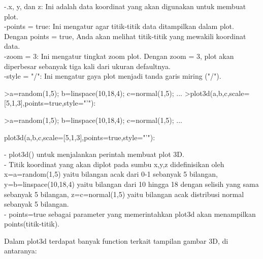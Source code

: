 \documentclass[a4paper,10pt]{article}
\begin{document}
\begin{eulernotebook}
\begin{eulercomment}
\begin{eulercomment}
\begin{eulercomment}
\begin{eulercomment}
\begin{eulercomment}
\begin{eulercomment}
\begin{eulercomment}
\begin{eulercomment}
\begin{eulercomment}
-.x, y, dan z: Ini adalah data koordinat yang akan digunakan untuk
membuat plot.\\
-points = true: Ini mengatur agar titik-titik data ditampilkan dalam
plot. Dengan points = true, Anda akan melihat titik-titik yang
mewakili koordinat data.\\
-zoom = 3: Ini mengatur tingkat zoom plot. Dengan zoom = 3, plot akan
diperbesar sebanyak tiga kali dari ukuran defaultnya.\\
-style = "/": Ini mengatur gaya plot menjadi tanda garis miring ("/").
\end{eulercomment}
\begin{eulerprompt}
>a=random(1,5); b=linspace(10,18,4); c=normal(1,5); ...
>plot3d(a,b,c,scale=[5,1,3],points=true,style="'"):
\end{eulerprompt}
\begin{eulercomment}
\textgreater{}a=random(1,5); b=linspace(10,18,4); c=normal(1,5); ...\\
\end{eulercomment}
\begin{eulerttcomment}
 plot3d(a,b,c,scale=[5,1,3],points=true,style="'"):
\end{eulerttcomment}
\begin{eulercomment}

- plot3d() untuk menjalankan perintah membuat plot 3D.\\
- Titik koordinat yang akan diplot pada sumbu x,y,z didefinisikan oleh
x=a=random(1,5) yaitu bilangan acak dari 0-1 sebanyak 5 bilangan,
y=b=linspace(10,18,4) yaitu bilangan dari 10 hingga 18 dengan selisih
yang sama sebanyak 5 bilangan, z=c=normal(1,5) yaitu bilangan acak
distribusi normal sebanyak 5 bilangan.\\
- points=true sebagai parameter yang memerintahkan plot3d akan
menampilkan points(titik-titik).
\end{eulercomment}
\begin{eulercomment}

\end{eulercomment}
\begin{eulercomment}
Dalam plot3d terdapat banyak function terkait tampilan gambar 3D, di
antaranya:


\end{eulercomment}
\end{eulercomment}
\end{eulercomment}
\end{eulercomment}
\end{eulercomment}
\end{eulercomment}
\end{eulercomment}
\end{eulercomment}
\end{eulercomment}
\end{eulernotebook}
\end{document}
